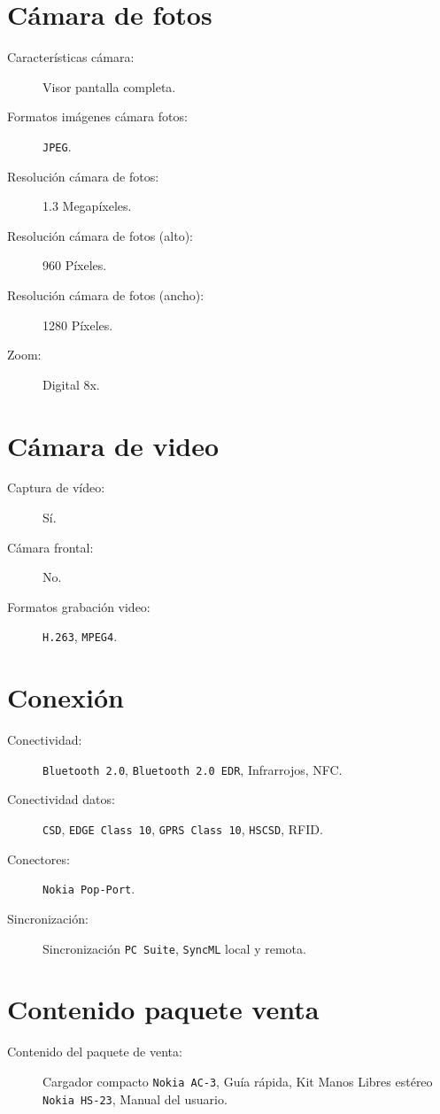 \section{Cámara de fotos}
\begin{description}
\item[Características cámara:] Visor pantalla completa.
\item[Formatos imágenes cámara fotos:] \texttt{JPEG}.
\item[Resolución cámara de fotos:] 1.3 Megapíxeles.
\item[Resolución cámara de fotos (alto):] 960 Píxeles.
\item[Resolución cámara de fotos (ancho):] 1280 Píxeles.
\item[Zoom:] Digital 8x.
\end{description} 
\section{Cámara de video}
\begin{description}
\item[Captura de vídeo:] Sí.
\item[Cámara frontal:] No.
\item[Formatos grabación video:] \texttt{H.263}, \texttt{MPEG4}.
\end{description}
\section{Conexión}
\begin{description}
\item[Conectividad:] \texttt{Bluetooth 2.0}, \texttt{Bluetooth 2.0 EDR}, 
Infrarrojos, \acs{NFC}.
\item[Conectividad datos:] \texttt{CSD}, \texttt{\acs{EDGE} Class 10},
\texttt{\acs{GPRS} Class 10}, \texttt{HSCSD}, \acs{RFID}.
\item[Conectores:] \texttt{Nokia Pop-Port}.
\item[Sincronización:] Sincronización \texttt{PC Suite}, \texttt{SyncML} local 
y remota.
\end{description}
\section{Contenido paquete venta}
\begin{description}
\item[Contenido del paquete de venta:] Cargador compacto \texttt{Nokia AC-3}, 
Guía rápida, Kit Manos Libres estéreo \texttt{Nokia HS-23}, Manual del usuario.
\end{description}
